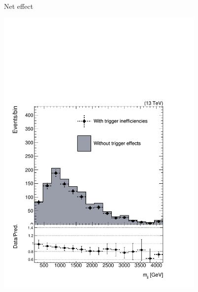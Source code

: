 \documentclass[aspectratio=169,xcolor=dvipsnames,,table,compress]{beamer}
\begin{document}
\begin{frame}
\begin{columns}[T]
\begin{column}{0.33\textwidth}
    \end{column}
    \pause 
    \begin{column}{0.33\textwidth}
      \centering 
      Net effect
      \begin{itemize}
      \end{itemize}
      \includegraphics[width=0.8\textwidth]{../figures/vbf/triggers/mjjsignal_jot12Mass.pdf}
    \end{column}
  \end{columns}
\end{frame}
\end{document}
